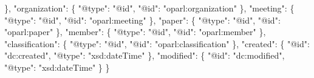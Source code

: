 \documentclass[,a4paper]{article}
\newenvironment{Shaded}{}{}
\newcommand{\DataTypeTok}[1]{\textcolor[rgb]{0.56,0.13,0.00}{{#1}}}
\newcommand{\StringTok}[1]{\textcolor[rgb]{0.25,0.44,0.63}{{#1}}}
\newcommand{\FunctionTok}[1]{\textcolor[rgb]{0.02,0.16,0.49}{{#1}}}
\begin{document}
\begin{Shaded}
\begin{Highlighting}[]
    \FunctionTok{\},}  
    \DataTypeTok{"organization"}\FunctionTok{:} \FunctionTok{\{}
        \DataTypeTok{"@type"}\FunctionTok{:} \StringTok{"@id"}\FunctionTok{,}
        \DataTypeTok{"@id"}\FunctionTok{:} \StringTok{"oparl:organization"}
    \FunctionTok{\},}
    \DataTypeTok{"meeting"}\FunctionTok{:} \FunctionTok{\{}
        \DataTypeTok{"@type"}\FunctionTok{:} \StringTok{"@id"}\FunctionTok{,}
        \DataTypeTok{"@id"}\FunctionTok{:} \StringTok{"oparl:meeting"}
    \FunctionTok{\},}
    \DataTypeTok{"paper"}\FunctionTok{:} \FunctionTok{\{}
        \DataTypeTok{"@type"}\FunctionTok{:} \StringTok{"@id"}\FunctionTok{,}
        \DataTypeTok{"@id"}\FunctionTok{:} \StringTok{"oparl:paper"}
    \FunctionTok{\},}
    \DataTypeTok{"member"}\FunctionTok{:} \FunctionTok{\{}
        \DataTypeTok{"@type"}\FunctionTok{:} \StringTok{"@id"}\FunctionTok{,}
        \DataTypeTok{"@id"}\FunctionTok{:} \StringTok{"oparl:member"}
    \FunctionTok{\},}
    \DataTypeTok{"classification"}\FunctionTok{:} \FunctionTok{\{}
        \DataTypeTok{"@type"}\FunctionTok{:} \StringTok{"@id"}\FunctionTok{,}
        \DataTypeTok{"@id"}\FunctionTok{:} \StringTok{"oparl:classification"}
    \FunctionTok{\},}
    \DataTypeTok{"created"}\FunctionTok{:} \FunctionTok{\{}
        \DataTypeTok{"@id"}\FunctionTok{:} \StringTok{"dc:created"}\FunctionTok{,}
        \DataTypeTok{"@type"}\FunctionTok{:} \StringTok{"xsd:dateTime"}
    \FunctionTok{\},}  
    \DataTypeTok{"modified"}\FunctionTok{:} \FunctionTok{\{}
        \DataTypeTok{"@id"}\FunctionTok{:} \StringTok{"dc:modified"}\FunctionTok{,}
        \DataTypeTok{"@type"}\FunctionTok{:} \StringTok{"xsd:dateTime"}
    \FunctionTok{\}}   
\FunctionTok{\}}
\end{Highlighting}
\end{Shaded}
\end{document}
